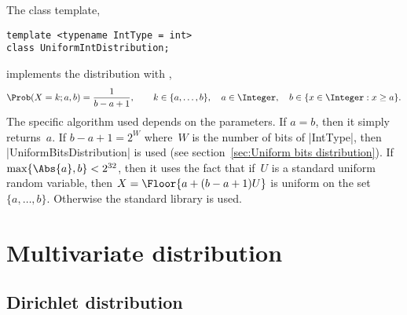 The class template,
\begin{verbatim}
template <typename IntType = int>
class UniformIntDistribution;
\end{verbatim}
implements the distribution with \pdf,
\begin{equation*}
  \Prob(X = k;a,b) = \frac{1}{b - a + 1},\qquad
  k \in \{a,\dots,b\},\quad
  a \in \Integer,\quad b \in \{x \in \Integer: x \ge a\}.
\end{equation*}
The specific algorithm used depends on the parameters. If $a = b$, then it
simply returns~$a$. If $b - a + 1 = 2^W$ where~$W$ is the number of bits of
|IntType|, then |UniformBitsDistribution| is used (see section~\ref{sec:Uniform
bits distribution}). If $\max\{\Abs{a}, b\} < 2^{32}$, then it uses the fact
that if~$U$ is a standard uniform random variable, then $X = \Floor{a + (b - a
+ 1) U}$ is uniform on the set $\{a,\dots,b\}$. Otherwise the standard library
is used.

\section{Multivariate distribution}
\label{sec:Multivariate distribution}

\subsection{Dirichlet distribution}
\label{sub:Dirichlet distribution}

